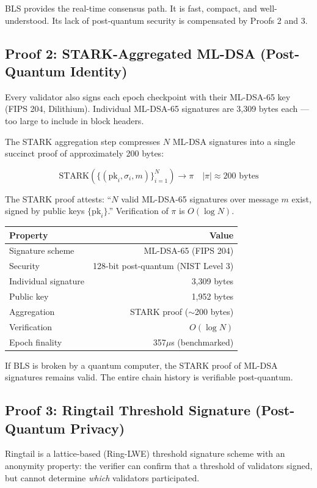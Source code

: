 \documentclass[11pt,a4paper]{article}
\begin{document}
BLS provides the real-time consensus path. It is fast, compact, and well-understood. Its lack of post-quantum security is compensated by Proofs 2 and 3.

\subsection{Proof 2: STARK-Aggregated ML-DSA (Post-Quantum Identity)}

Every validator also signs each epoch checkpoint with their ML-DSA-65 key (FIPS 204, Dilithium). Individual ML-DSA-65 signatures are 3,309 bytes each --- too large to include in block headers.

The STARK aggregation step compresses $N$ ML-DSA signatures into a single succinct proof of approximately 200 bytes:

$$\text{STARK}(\{(\text{pk}_i, \sigma_i, m)\}_{i=1}^{N}) \to \pi \quad |\pi| \approx 200 \text{ bytes}$$

The STARK proof attests: ``$N$ valid ML-DSA-65 signatures over message $m$ exist, signed by public keys $\{\text{pk}_i\}$.'' Verification of $\pi$ is $O(\log N)$.

\begin{center}
\begin{tabular}{lr}
\toprule
\textbf{Property} & \textbf{Value} \\
\midrule
Signature scheme & ML-DSA-65 (FIPS 204) \\
Security & 128-bit post-quantum (NIST Level 3) \\
Individual signature & 3,309 bytes \\
Public key & 1,952 bytes \\
Aggregation & STARK proof ($\sim$200 bytes) \\
Verification & $O(\log N)$ \\
Epoch finality & 357$\mu$s (benchmarked) \\
\bottomrule
\end{tabular}
\end{center}

If BLS is broken by a quantum computer, the STARK proof of ML-DSA signatures remains valid. The entire chain history is verifiable post-quantum.

\subsection{Proof 3: Ringtail Threshold Signature (Post-Quantum Privacy)}

Ringtail is a lattice-based (Ring-LWE) threshold signature scheme with an anonymity property: the verifier can confirm that a threshold of validators signed, but cannot determine \textit{which} validators participated.
\end{document}
